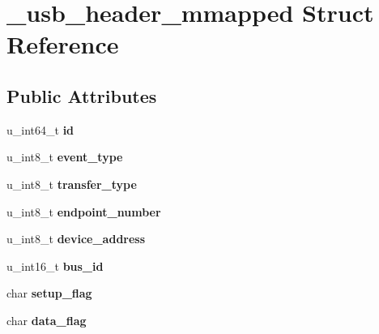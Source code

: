 \hypertarget{struct__usb__header__mmapped}{
\section{\_\-usb\_\-header\_\-mmapped Struct Reference}
\label{struct__usb__header__mmapped}
}
\subsection*{Public Attributes}
\begin{DoxyCompactItemize}
\item 
\hypertarget{struct__usb__header__mmapped_a84d7304626ecbe1481b839ea0979a734}{
u\_\-int64\_\-t {\bfseries id}}
\label{struct__usb__header__mmapped_a84d7304626ecbe1481b839ea0979a734}

\item 
\hypertarget{struct__usb__header__mmapped_a3e32d1aada896f188c0a2353fa66ebbb}{
u\_\-int8\_\-t {\bfseries event\_\-type}}
\label{struct__usb__header__mmapped_a3e32d1aada896f188c0a2353fa66ebbb}

\item 
\hypertarget{struct__usb__header__mmapped_a2742e09d63acbf5316830d9e27a988a8}{
u\_\-int8\_\-t {\bfseries transfer\_\-type}}
\label{struct__usb__header__mmapped_a2742e09d63acbf5316830d9e27a988a8}

\item 
\hypertarget{struct__usb__header__mmapped_ac03e9dd42ed07b1c78840d2b0eaca1b8}{
u\_\-int8\_\-t {\bfseries endpoint\_\-number}}
\label{struct__usb__header__mmapped_ac03e9dd42ed07b1c78840d2b0eaca1b8}

\item 
\hypertarget{struct__usb__header__mmapped_ab47b69560c7dc9e5bc8555d62bee729d}{
u\_\-int8\_\-t {\bfseries device\_\-address}}
\label{struct__usb__header__mmapped_ab47b69560c7dc9e5bc8555d62bee729d}

\item 
\hypertarget{struct__usb__header__mmapped_a6b1068e74d5664b71d2e3bd7f764c775}{
u\_\-int16\_\-t {\bfseries bus\_\-id}}
\label{struct__usb__header__mmapped_a6b1068e74d5664b71d2e3bd7f764c775}

\item 
\hypertarget{struct__usb__header__mmapped_a81ef091146859e1a200fca8cb8f7bc8e}{
char {\bfseries setup\_\-flag}}
\label{struct__usb__header__mmapped_a81ef091146859e1a200fca8cb8f7bc8e}

\item 
\hypertarget{struct__usb__header__mmapped_a1fb1c96fdf779bacb10ef2461e05b3af}{
char {\bfseries data\_\-flag}}
\label{struct__usb__header__mmapped_a1fb1c96fdf779bacb10ef2461e05b3af}


\end{DoxyCompactItemize}

